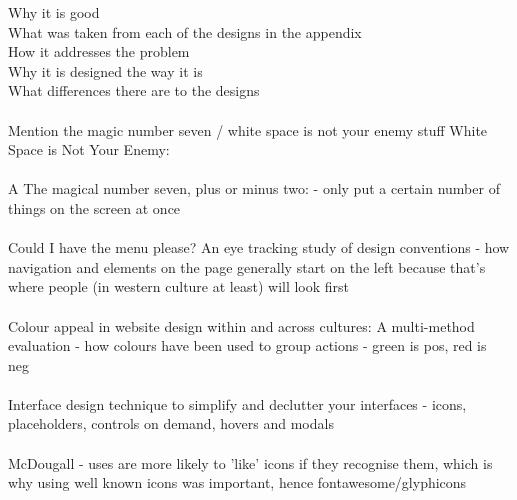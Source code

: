 {\color{red}
\noindent 
Why it is good\ \\
What was taken from each of the designs in the appendix\ \\
How it addresses the problem \ \\
Why it is designed the way it is\ \\
What differences there are to the designs
}
\ \\
\ \\
\noindent
{\color{red}
Mention the magic number seven / white space is not your enemy stuff
White Space is Not Your Enemy: \cite{golombisky2013white}\ \\
\ \\A
The magical number seven, plus or minus two: \cite{miller1956magical} - only put a certain number of things on the screen at once\ \\
\ \\
Could I have the menu please? An eye tracking study of design conventions \cite{mccarthy2004could} - how navigation and elements on the page generally start on the left because that's where people (in western culture at least) will look first\ \\
\ \\
Colour appeal in website design within and across cultures: A multi-method evaluation  \cite{cyr2010colour} - how colours have been used to group actions - green is pos, red is neg\ \\
\ \\
Interface design technique to simplify and declutter your interfaces \cite{depot2014clutter} - icons, placeholders, controls on demand, hovers and modals\ \\
\ \\
McDougall - uses are more likely to 'like' icons if they recognise them, which is why using well known icons was important, hence fontawesome/glyphicons \cite{mcdougall2008like}
}

